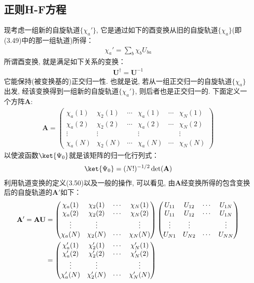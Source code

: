 \subsection{正则H-F方程}
现考虑一组新的自旋轨道$\{\chi_a'\}$, 
它是通过如下的酉变换从旧的自旋轨道$\{\chi_a\}$(即(3.49)中的那一组轨道)所得：
\begin{align}
	\chi_a' = \sum_b\chi_bU_{ba}
\end{align}
所谓酉变换, 
就是满足如下关系的变换：
\begin{align}
	\mathbf{U}^\dagger = \mathbf{U}^{-1}
\end{align}
它能保持(被变换基的)正交归一性. 
也就是说, 
若从一组正交归一的自旋轨道$\{\chi_a\}$出发, 
经该变换得到一组新的自旋轨道$\{\chi_a'\}$, 
则后者也是正交归一的. 
下面定义一个方阵$\mathbf{A}$:
\begin{align}
	\mathbf{A} = 
	\begin{pmatrix}
		\chi_a(1) & \chi_2(1) & \cdots & \chi_a(1) & \cdots & \chi_N(1) \\
		\chi_a(2) & \chi_2(2) & \cdots & \chi_a(2) & \cdots & \chi_N(2) \\
		\vdots    & \vdots    &        & \vdots    &        & \vdots    \\
		\chi_a(N) & \chi_2(N) & \cdots & \chi_a(N) & \cdots & \chi_N(N)
	\end{pmatrix}
\end{align}
以使波函数$\ket{\Psi_0}$就是该矩阵的归一化行列式：
\begin{align}
	\ket{\Psi_0} = (N!)^{-1/2}\det(\mathbf{A})
\end{align}
利用轨道变换的定义(3.50)以及一般的操作, 
可以看见, 
由$\mathbf{A}$经变换所得的包含变换后的自旋轨道的$\mathbf{A}'$如下：
\begin{align}
	\mathbf{A}'  = \mathbf{AU} & = 
	\begin{pmatrix}
		\chi_a(1) & \chi_2(1) & \cdots & \chi_N(1) \\
		\chi_a(2) & \chi_2(2) & \cdots & \chi_N(2) \\
		\vdots    & \vdots    &        & \vdots    \\
		\chi_a(N) & \chi_2(N) & \cdots & \chi_N(N)
	\end{pmatrix}
	\begin{pmatrix}
		U_{11} & U_{12} & \cdots & U_{1N} \\
		U_{11} & U_{12} & \cdots & U_{1N} \\
		\vdots & \vdots &        & \vdots \\
		U_{N1} & U_{N2} & \cdots & U_{NN}
	\end{pmatrix} \notag\\
	& = \begin{pmatrix}
		\chi_a'(1) & \chi_2'(1) & \cdots & \chi_N'(1) \\
		\chi_a'(2) & \chi_2'(2) & \cdots & \chi_N'(2) \\
		\vdots     & \vdots     &        & \vdots     \\
		\chi_a'(N) & \chi_2'(N) & \cdots & \chi_N'(N)
	\end{pmatrix}
\end{align}
